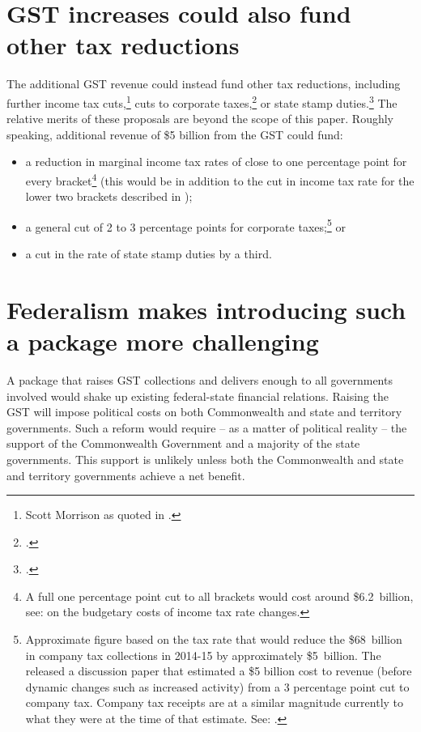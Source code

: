 \section{GST increases could also fund other tax reductions}\label{sec:GST-4-3}
The additional GST revenue could instead fund other tax reductions, including further income tax cuts,\footnote{Scott Morrison as quoted in \textcite{Coorey2015a}.}  cuts to corporate taxes,\footcite{FinancialServicesCouncil2015-Tax-white-paper-submission}  or state stamp duties.\footcite{PropertyCouncil2015-Tax-reform}  The relative merits of these proposals are beyond the scope of this paper. Roughly speaking, additional revenue of \$5 billion from the GST could fund:
\begin{itemize}
\item	a reduction in marginal income tax rates of close to one percentage point for every bracket\footnote{A full one percentage point cut to all brackets would cost around \$6.2~billion, see:  on the budgetary costs of income tax rate changes.}  (this would be in addition to the cut in income tax rate for the lower two brackets described in ); 
\item 	a general cut of 2 to 3 percentage points for corporate taxes;\footnote{Approximate figure based on the tax rate that would reduce the \$68~billion in company tax collections in 2014-15 by approximately \$5~billion. The \textcite{BusinessTaxWorkingGroup2012} released a discussion paper that estimated a \$5 billion cost to revenue (before dynamic changes such as increased activity) from a 3 percentage point cut to company tax. Company tax receipts are at a similar magnitude currently to what they were at the time of that estimate. See: \textcite[][Statement~4]{Treasury2015BudgetPapers201516}.}  or
\item 	a cut in the rate of state stamp duties by a third.
\end{itemize}
\section{Federalism makes introducing such a package more challenging\label{sec:GST-4-4}}
A package that raises GST collections and delivers enough to all governments involved would shake up existing federal-state financial relations. 
Raising the GST will impose political costs on both Commonwealth and state and territory governments. Such a reform would require – as a matter of political reality – the support of the Commonwealth Government and a majority of the state governments. This support is unlikely unless both the Commonwealth and state and territory governments achieve a net benefit. 

